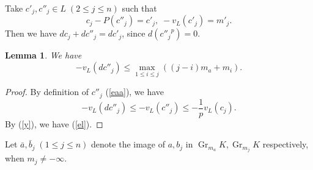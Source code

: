 \documentclass[sn-mathphys-num]{sn-jnl}
\numberwithin{equation}{section}
\newcommand{\Gr}{\operatorname{Gr}}
\theoremstyle{plain}
\newtheorem{lemm}[theo]{Lemma}
\theoremstyle{definition}
\begin{document}
Take $c'_j,c''_j\in L\;(2\leq j\leq n)$ such that
\begin{equation}\label{eaa}
c_j-P(c''_j)=c'_j,\; -v_L(c'_j)=m'_j.
\end{equation}
Then we have $dc_j+dc''_j=dc'_j$, since $d({c''_j}^p)=0$. 


  

  

\begin{lemm}\label{laee}
  We have
  \begin{equation}\label{el}
  -v_L(dc''_j)\leq\max_{1\leq i\leq j}((j-i)m_a+m_{i}).
  \end{equation}
\end{lemm}

\begin{proof}
  By definition of $c''_j$ (\ref{eaa}), we have
  \begin{equation}
  -v_L(dc''_j)\leq-v_L(c''_j)\leq-\frac{1}{p}v_L(c_j).
  \end{equation}
  By (\ref{y}), we have (\ref{el}).  
\end{proof}


  

Let $\bar{a},\bar{b}_j\;(1\leq j\leq n)$ denote the image of $a,b_j$ in $\Gr_{m_a}K,\Gr_{m_j}K$ respectively, when $m_j\neq-\infty$.
\end{document}
